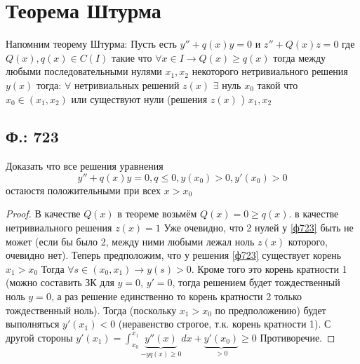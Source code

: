 \documentclass{article}
\begin{document}
\section{Теорема Штурма}
Напомним теорему Штурма: Пусть есть $y''+q(x)y=0$ и $z''+Q(x)z=0$ где $Q(x), q(x) \in C(I)$ такие что $\forall x \in I \rightarrow Q(x) \geq q(x)$ тогда между любыми последовательными нулями $x_1 , x_2$ некоторого нетривиального решения $y(x)$ тогда: $\forall$ нетривиальных решений $z(x)$ $\exists$ нуль $x_0$ такой что $x_0 \in (x_1,x_2)$ или существуют нули (решения $z(x)$ ) $x_1,x_2$
\subsection{Ф.: 723}
Доказать что все решения уравнения
\begin{equation}\label{ф723}
 y''+q(x)y=0, q \leq 0, y(x_0)>0,y'(x_0)>0
\end{equation}
остаюстя положительными при всех $x>x_0$
\begin{proof}
В качестве $Q(x)$ в теореме возьмём $Q(x)=0 \geq q(x)$. в качестве нетривиального решения $z(x)=1$ Уже очевидно, что  2 нулей у  \ref{ф723} быть не может (если бы было 2, между ними любыми лежал ноль $z(x)$ которого, очевидно нет).
Теперь предположим, что у решения  \ref{ф723} существует корень $x_1>x_0$ Тогда $\forall s \in (x_0,x_1) \rightarrow y(s)>0$. Кроме того это корень кратности 1 (можно составить ЗК для $y=0$, $y'=0$, тогда решением будет тождественный ноль $y=0$, а раз решение единственно то корень кратности 2 только тождественный ноль). Тогда (поскольку $x_1>x_0$ по предположению) будет выполняться $y'(x_1)<0$ (неравенство строгое, т.к. корень кратности 1). С другой стороны $y'(x_1)= \int^{x_1}_{x_0} \underbrace{y''(x)}_{-y q(x) \geq 0} dx + \underbrace{y'(x_0)}_{>0} \geq 0$ Противоречие. 
\end{proof}
\end{document}
